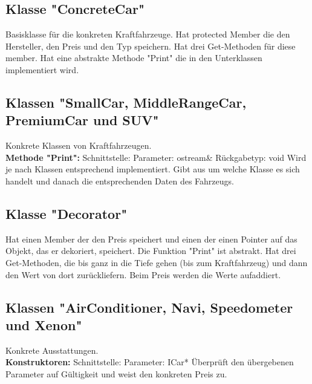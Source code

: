 \documentclass[12pt,a4paper]{article}
\begin{document}
\subsection {Klasse "ConcreteCar"}
Basisklasse für die konkreten Kraftfahrzeuge. Hat protected Member die den Hersteller, den Preis und den Typ speichern. Hat drei Get-Methoden für diese member. Hat eine abstrakte Methode "Print" die in den Unterklassen implementiert wird.
\\

\subsection {Klassen "SmallCar, MiddleRangeCar, PremiumCar und SUV"}
Konkrete Klassen von Kraftfahrzeugen.
\\

\textbf {Methode "Print": } 
\newline
Schnittstelle:
\newline
Parameter: ostream\&
\newline
Rückgabetyp: void
\newline
Wird je nach Klassen entsprechend implementiert. Gibt aus um welche Klasse es sich handelt und danach die entsprechenden Daten des Fahrzeugs.
\\

\subsection {Klasse "Decorator"}
Hat einen Member der den Preis speichert und einen der einen Pointer auf das Objekt, das er dekoriert, speichert. Die Funktion "Print" ist abstrakt. Hat drei Get-Methoden, die bis ganz in die Tiefe gehen (bis zum Kraftfahrzeug) und dann den Wert von dort zurückliefern. Beim Preis werden die Werte aufaddiert.
\\

\subsection {Klassen "AirConditioner, Navi, Speedometer und Xenon"}
Konkrete Ausstattungen.
\\

\textbf {Konstruktoren: } 
\newline
Schnittstelle: 
\newline
Parameter: ICar*
\newline
Überprüft den übergebenen Parameter auf Gültigkeit und weist den konkreten Preis zu.
\\
\end{document}
